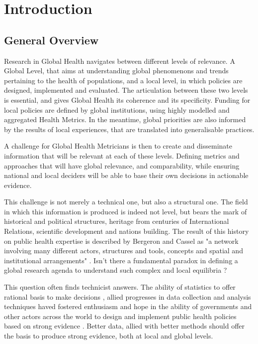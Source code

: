 \section{Introduction}

\subsection{General Overview}

Research in Global Health navigates between different levels of relevance. A Global Level, that aims at understanding global phenomenons and trends pertaining to the health of populations, and a local level, in which policies are designed, implemented and evaluated. The articulation between these two levels is essential, and gives Global Health its coherence and its specificity. Funding for local policies are defined by global institutions, using highly modelled and aggregated Health Metrics. In the meantime, global priorities are also informed by the results of local experiences, that are translated into generalisable practices.

A challenge for Global Health Metricians is then to create and disseminate information that will be relevant at each of these levels. Defining metrics and approaches that will have global relevance, and comparability, while ensuring national and local deciders will be able to base their own decisions in actionable evidence.

This challenge is not merely a technical one, but also a structural one. The field in which this information is produced is indeed not level, but bears the mark of historical and political structures, heritage from centuries of International Relations, scientific development and nations building. The result of this history on public health expertise is described by Bergeron and Cassel as "a network involving many different actors, structures and tools, concepts and spatial and institutional arrangements" \citep{bergeron_savoirs_2014}. Isn't there a fundamental paradox in defining a global research agenda to understand such complex and local equilibria ?

This question often finds technicist answers. The ability of statistics to offer rational basis to make decisions \citep{desrosieres_politique_1993,porter_trust_1996},
allied progresses in data collection and analysis techniques haved fostered enthusiasm and hope in the ability of governments and other actors across the world to design and implement public health policies based on strong evidence \citep{abou-zahr_health_2005,shibuya_health_2005,bambas_nolen_strengthening_2005,mutemwa_hmis_2006,boerma_public_2013}. Better data, allied with better methods should  offer the basis to produce strong evidence, both at local and global levels.

